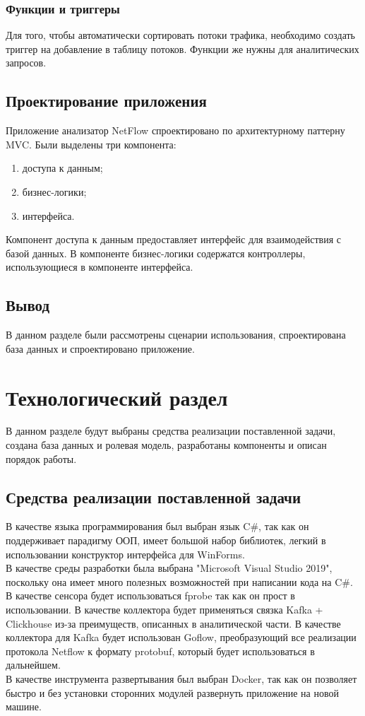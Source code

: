\subsubsection{Функции и триггеры}
Для того, чтобы автоматически сортировать потоки трафика, необходимо создать триггер на добавление в таблицу потоков. Функции же нужны для аналитических запросов.

\subsection{Проектирование приложения}
Приложение анализатор NetFlow спроектировано по архитектурному паттерну MVC.
Были выделены три компонента:
\begin{enumerate}
	\item доступа к данным;
	\item бизнес-логики;
	\item интерфейса.
\end{enumerate}
\indent \indent Компонент доступа к данным предоставляет интерфейс для взаимодействия с базой данных. В компоненте бизнес-логики содержатся контроллеры, использующиеся в компоненте интерфейса.
\subsection{Вывод}
В данном разделе были рассмотрены сценарии использования, спроектирована база данных и спроектировано приложение.

\newpage
\section{Технологический раздел}
В данном разделе будут выбраны средства реализации поставленной задачи, создана база данных и ролевая модель, разработаны компоненты и описан порядок работы.
\subsection{Средства реализации поставленной задачи}
В качестве языка программирования был выбран язык C\#, так как он поддерживает парадигму ООП, имеет большой набор библиотек, легкий в использовании конструктор интерфейса для WinForms\cite{sharp}. \\
\indent В качестве среды разработки была выбрана "Microsoft Visual Studio 2019"\cite{vs}, поскольку она имеет много полезных возможностей при написании кода на C\#\cite{vs}. \\
\indent В качестве сенсора будет использоваться fprobe так как он прост в использовании. В качестве коллектора будет применяться связка Kafka + Clickhouse из-за преимуществ, описанных в аналитической части. В качестве коллектора для Kafka будет использован Goflow, преобразующий все реализации протокола Netflow к формату protobuf, который будет использоваться в дальнейшем. \\
\indent В качестве инструмента развертывания был выбран Docker, так как он позволяет быстро и без установки сторонних модулей развернуть приложение на новой машине.

